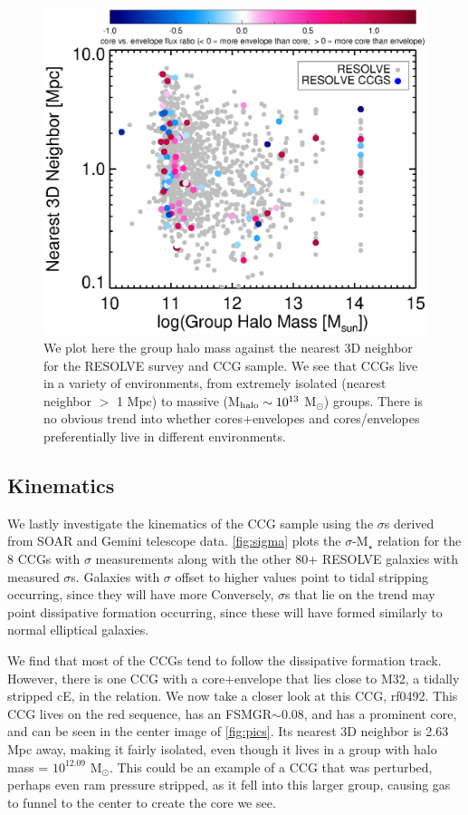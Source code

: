 \documentclass[iop,apj]{emulateapj}
\begin{document}
\begin{figure}[t]
\begin{center}
\includegraphics{nn_groupmass.eps}
\caption{We plot here the group halo mass against the nearest 3D neighbor for the RESOLVE survey and CCG sample. We see that CCGs live in a variety of environments, from extremely isolated (nearest neighbor $>$ 1 Mpc) to massive (M$_{\rm halo} \sim 10^{13}$ M$_{\odot}$) groups. There is no obvious trend into whether cores+envelopes and cores/envelopes preferentially live in different environments.}
\label{fig:envplot}
\end{center}
\end{figure}

\subsection{Kinematics}
\label{kin}
\noindent We lastly investigate the kinematics of the CCG sample using the $\sigma$s derived from SOAR and Gemini telescope data. \autoref{fig:sigma} plots the $\sigma$-M$_{\star}$ relation for the 8 CCGs with $\sigma$ measurements along with the other 80+ RESOLVE galaxies with measured $\sigma$s. Galaxies with $\sigma$ offset to higher values point to tidal stripping occurring, since  they will have more  Conversely, $\sigma$s that lie on the trend may point dissipative formation occurring, since these will have formed similarly to normal elliptical galaxies.

We find that most of the CCGs tend to follow the dissipative formation track. However, there is one CCG with a core+envelope that lies close to M32, a tidally stripped cE, in the relation. We now take a closer look at this CCG, rf0492. This CCG lives on the red sequence, has an FSMGR$\sim 0.08$, and has a prominent core, and can be seen in the center image of \autoref{fig:pics}. Its nearest 3D neighbor is 2.63 Mpc away, making it fairly isolated, even though it lives in a group with halo mass = $10^{12.09}$ M$_{\odot}$. This could be an example of a CCG that was perturbed, perhaps even ram pressure stripped, as it fell into this larger group, causing gas to funnel to the center to create the core we see. 
\end{document}
